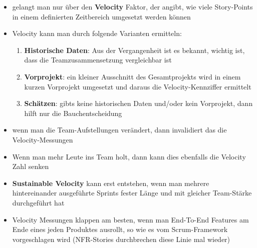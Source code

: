 
\begin{itemize}
  \item gelangt man nur über den \textbf{Velocity} Faktor, der angibt, wie viele Story-Points in
    einem definierten Zeitbereich umgesetzt werden können
  \item Velocity kann man durch folgende Varianten ermitteln:
    \begin{enumerate}
      \item \textbf{Historische Daten}: Aus der Vergangenheit ist es bekannt, wichtig ist,
        dass die Teamzusammensetzung vergleichbar ist
      \item \textbf{Vorprojekt}: ein kleiner Ausschnitt des Gesamtprojekts wird in
        einem kurzen Vorprojekt umgesetzt und daraus die Velocity-Kennziffer ermittelt
      \item \textbf{Schätzen}: gibts keine historischen Daten und/oder kein Vorprojekt, dann
        hilft nur die Bauchentscheidung
    \end{enumerate}
  \item wenn man die Team-Aufstellungen verändert, dann invalidiert das die
    Velocity-Messungen
  \item Wenn man mehr Leute ins Team holt, dann kann dies ebenfalls die Velocity Zahl
    senken
  \item \textbf{Sustainable Velocity} kann erst entstehen, wenn man mehrere hintereinander
    ausgeführte Sprints fester Länge und mit gleicher Team-Stärke durchgeführt hat
  \item Velocity Messungen klappen am besten, wenn man End-To-End Features am Ende eines
    jeden Produktes ausrollt, so wie es vom Scrum-Framework vorgeschlagen wird
    (NFR-Stories durchbrechen diese Linie mal wieder)
\end{itemize}


